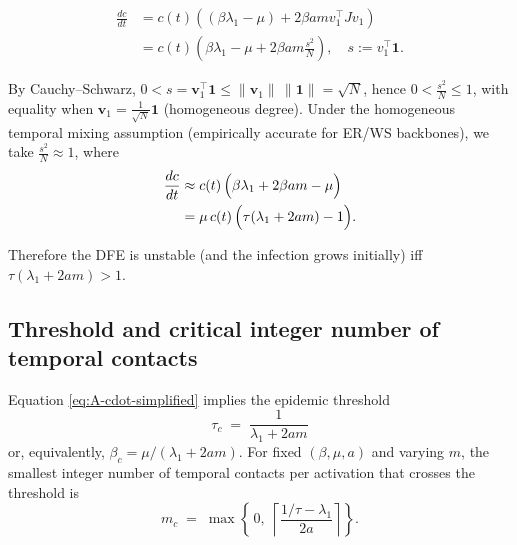 \documentclass[pdflatex,sn-mathphys-num]{sn-jnl}%
\theoremstyle{thmstyleone}%
\theoremstyle{thmstyletwo}%
\theoremstyle{thmstylethree}%
\begin{document}
\begin{appendices}
\begin{equation}
\begin{split}
\frac{dc}{dt} &= c(t) \left( (\beta\lambda_1 - \mu) + 2\beta am v_1^\top J v_1 \right) \\
&= c(t) \left( \beta\lambda_1 - \mu + 2\beta am \frac{s^2}{N} \right), \quad s := v_1^\top \mathbf{1}.
\end{split}
\label{eq:A5-final}
\end{equation}

By Cauchy–Schwarz, $0< s=\mathbf{v}_1^\top \mathbf{1}\le \|\mathbf{v}_1\|\,\|\mathbf{1}\|=\sqrt{N}$,
hence $0< \tfrac{s^2}{N}\le 1$, with equality when
$\mathbf{v}_1=\tfrac{1}{\sqrt{N}}\mathbf{1}$ (homogeneous degree).
Under the homogeneous temporal mixing assumption (empirically accurate for
ER/WS backbones), we take $\tfrac{s^2}{N} \approx 1$, where
\begin{equation}
\begin{split}
\frac{dc}{dt}
  &\approx c(t)\,\Bigl(\beta\lambda_1 + 2\beta a m - \mu\Bigr) \\
  &= \mu\,c(t)\,\Bigl(\tau(\lambda_1+2am)-1\Bigr).
\end{split}
\label{eq:A-cdot-simplified}
\end{equation}

Therefore the DFE is unstable (and the infection grows initially) iff
$\tau(\lambda_1+2am)>1$.

\subsection{Threshold and critical integer number of temporal contacts}
Equation \eqref{eq:A-cdot-simplified} implies the epidemic threshold
\begin{equation}
  \boxed{\quad \tau_c \;=\; \frac{1}{\lambda_1+2am}\quad}
  \label{eq:A-threshold}
\end{equation}
or, equivalently, $\beta_c=\mu/(\lambda_1+2am)$. For fixed $(\beta,\mu,a)$ and varying
$m$, the smallest integer number of temporal contacts per activation that crosses the
threshold is
\begin{equation}
  \boxed{\quad
  m_c \;=\; \max\!\left\{\,0,\; \left\lceil \frac{1/\tau - \lambda_1}{2a}\right\rceil \right\}.
  \quad}
  \label{eq:A-mc}
\end{equation}


\end{appendices}
\end{document}
